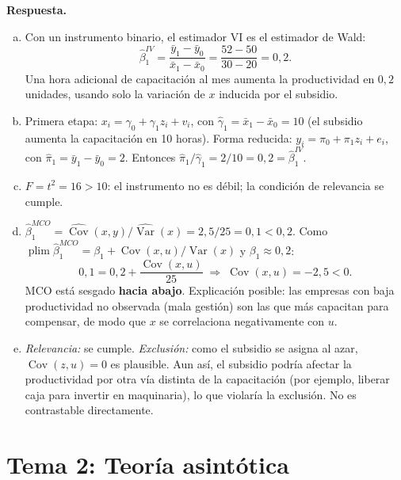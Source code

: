 \documentclass[12pt,letterpaper]{article}
\DeclareMathOperator{\var}{Var}
\DeclareMathOperator{\cov}{Cov}
\DeclareMathOperator{\plim}{plim}
\newenvironment{resp}{\begingroup\color{blue}\par\noindent\textbf{Respuesta.}\ }{\par\endgroup}
\newcommand{\tema}[1]{\section*{#1}}
\begin{document}
\begin{enumerate}[1.]
\begin{resp}
\begin{enumerate}[a)]
\item Con un instrumento binario, el estimador VI es el estimador de Wald:
\[
\hat\beta_1^{IV}=\frac{\bar y_1-\bar y_0}{\bar x_1-\bar x_0}=\frac{52-50}{30-20}=0{,}2 .
\]
Una hora adicional de capacitación al mes aumenta la productividad en $0{,}2$ unidades, usando solo la variación de $x$ inducida por el subsidio.
\item Primera etapa: $x_i=\gamma_0+\gamma_1z_i+v_i$, con $\hat\gamma_1=\bar x_1-\bar x_0=10$ (el subsidio aumenta la capacitación en 10 horas). Forma reducida: $y_i=\pi_0+\pi_1z_i+e_i$, con $\hat\pi_1=\bar y_1-\bar y_0=2$. Entonces $\hat\pi_1/\hat\gamma_1=2/10=0{,}2=\hat\beta_1^{IV}$.
\item $F=t^2=16>10$: el instrumento no es débil; la condición de relevancia se cumple.
\item $\hat\beta_1^{MCO}=\widehat{\cov}(x,y)/\widehat{\var}(x)=2{,}5/25=0{,}1<0{,}2$. Como $\plim\hat\beta_1^{MCO}=\beta_1+\cov(x,u)/\var(x)$ y $\beta_1\approx0{,}2$:
\[
0{,}1=0{,}2+\frac{\cov(x,u)}{25}\;\Rightarrow\;\cov(x,u)=-2{,}5<0 .
\]
MCO está sesgado \textbf{hacia abajo}. Explicación posible: las empresas con baja productividad no observada (mala gestión) son las que más capacitan para compensar, de modo que $x$ se correlaciona negativamente con $u$.
\item \emph{Relevancia:} se cumple. \emph{Exclusión:} como el subsidio se asigna al azar, $\cov(z,u)=0$ es plausible. Aun así, el subsidio podría afectar la productividad por otra vía distinta de la capacitación (por ejemplo, liberar caja para invertir en maquinaria), lo que violaría la exclusión. No es contrastable directamente.
\end{enumerate}
\end{resp}
\end{enumerate}

\newpage
\tema{Tema 2: Teoría asintótica}
\end{document}
